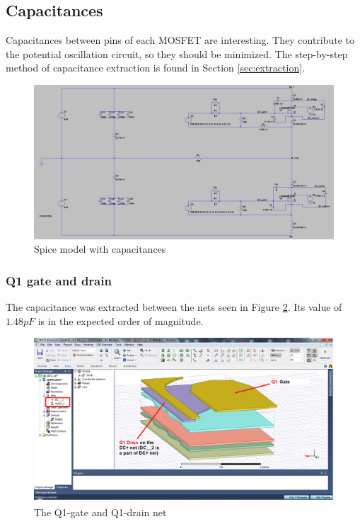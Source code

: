 \subsection{Capacitances}
\label{sec:capacitances}

Capacitances between pins of each MOSFET are interesting. They contribute to the potential oscillation circuit, so they should be minimized. The step-by-step method of capacitance extraction is found in Section \ref{sec:extraction}.

\begin{figure}[H]
	\centering
	\includegraphics[width=\textwidth]{pictures/implementation/cap/spice_cap_1.PNG}
	\caption{Spice model with capacitances}
	\label{fig:spice_cap}
\end{figure}

\subsubsection{Q1 gate and drain}
\label{sec:q1_gate_drain}

The capacitance was extracted between the nets seen in Figure \ref{fig:cap_q1_g_d}. Its value of $1.48 pF$ is in the expected order of magnitude.

\begin{figure}[H]
	\centering
	\includegraphics[width=\textwidth]{pictures/implementation/cap/cap_q1_g_d.PNG}
	\caption{The Q1-gate and Q1-drain net}
	\label{fig:cap_q1_g_d}
\end{figure}

